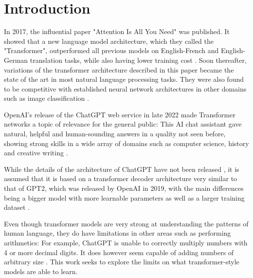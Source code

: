 \section{Introduction}

In 2017, the influential paper "Attention Is All You Need" \cite{allyouneed} was published. It showed that a new language model architecture, which they called the "Transformer", outperformed all previous models on English-French and English-German translation tasks, while also having lower training cost . Soon thereafter, variations of the transformer architecture described in this paper became the state of the art in most natural language processing tasks. They were also found to be competitive with established neural network architectures in other domains such as image classification .

OpenAI's release of the ChatGPT web service in late 2022 \cite{openai_chatgpt_2022} made Transformer networks a topic of relevance for the general public: This AI chat assistant gave natural, helpful and human-sounding answers in a quality not seen before, showing strong skills in a wide array of domains such as computer science, history and creative writing \cite{Savelka_2023} .

While the details of the architecture of ChatGPT have not been released \cite{openai_chatgpt_2022} \cite{openai2023gpt4}, it is assumed that it is based on a transformer decoder architecture very similar to that of GPT2, which was released by OpenAI in 2019, with the main differences being a bigger model with more learnable parameters as well as a larger training dataset \cite{OpenGenus2023GPTComparison}.

Even though transformer models are very strong at understanding the patterns of human language, they do have limitations in other areas such as performing arithmetics:
For example, ChatGPT is unable to correctly multiply numbers with 4 or more decimal digits. It does however seem capable of adding numbers of arbitrary size \cite{openai2023gpt4} .  This work seeks to explore the limits on what transformer-style models are able to learn.